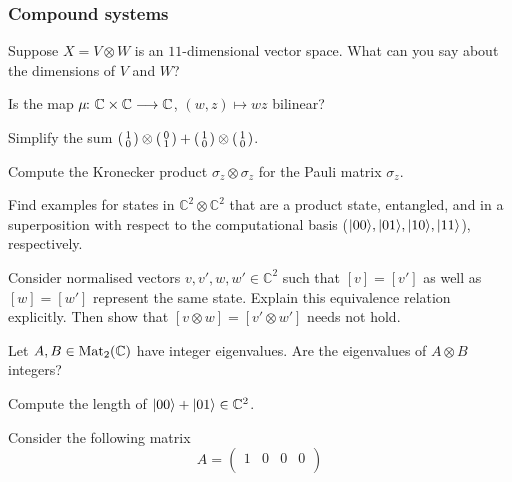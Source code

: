 \documentclass[a4paper, oneside, 12pt]{amsart}
\begin{document}
\subsubsection*{Compound systems}
\begin{thmlist}
  \item Suppose \(X= V\otimes W\) is an \(11\)-dimensional vector space. What can you say about the dimensions of \(V\) and \(W\)?
  \item Is the map \(\mu \from \mathbb{C} \times \mathbb{C} \to \mathbb{C}\), \((w,z) \mapsto wz\) bilinear?
  \item Simplify the sum \(
  \begin{psmallmatrix}
    1 \\ 0
  \end{psmallmatrix} \otimes
  \begin{psmallmatrix}
     0 \\ 1
  \end{psmallmatrix}
  +
  \begin{psmallmatrix}
    1 \\ 0
  \end{psmallmatrix} \otimes
  \begin{psmallmatrix}
    1 \\ 0
  \end{psmallmatrix}
\).
  \item Compute the Kronecker product \(\sigma_{z}\otimes \sigma_{z}\) for the Pauli matrix \(\sigma_{z}\).
  \item Find examples for states in \( \mathbb{C}^{2}\otimes \mathbb{C}^{2}\) that are  a product state, entangled, and in a superposition with respect to the computational basis (\(\lvert00\rangle,\lvert01\rangle, \lvert10\rangle, \lvert11\rangle\)), respectively.
  \item Consider normalised vectors \(v, v', w, w' \in \mathbb{C}^{2}\) such that \([v]=[v']\) as well as  \([w]=[w']\) represent the same state.
  Explain this equivalence relation explicitly.
  Then show that \([v\otimes w] = [v' \otimes w']\) needs not hold.
  \item Let \(A , B \in \operatorname{Mat}_{2}( \mathbb{C})\) have integer eigenvalues.
  Are the eigenvalues of \(A\otimes B\) integers?
  \item Compute the length of \(\lvert00\rangle + \lvert01\rangle \in \mathbb{C}^{2}\).
  \item Consider the following matrix
  \begin{equation*}
      A=\begin{pmatrix}
    1 & 0 & 0 & 0 \\

\end{pmatrix}
\end{equation*}
\end{thmlist}
\end{document}
